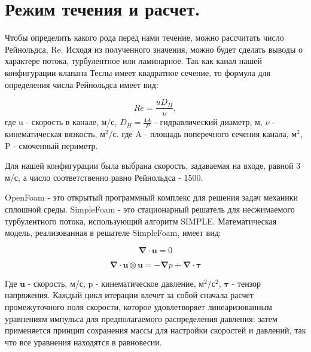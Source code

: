 \documentclass[14pt,a4paper]{article}
\begin{document}
    \section*{Режим течения и расчет.}        
        
        Чтобы определить какого рода перед нами течение, можно рассчитать число Рейнольдса, Re. Исходя из полученного значения, можно будет сделать выводы о характере потока, турбулентное или ламинарное.
        Так как канал нашей конфигурации клапана Теслы имеет квадратное сечение, то формула для определения числа Рейнольдса имеет вид:
        
        \begin{equation}\label{eqn:Re}
            Re = \frac{u D_{H}}{\nu},
        \end{equation}            
        где  u - скорость в канале, м/с, $ D_{H} = \frac{4A}{P} $ - гидравлический диаметр, м, $\nu$ - кинематическая вязкость, м$^{2}/$с. 
        где A - площадь поперечного сечения канала, м$^{2}$, P - смоченный периметр. 
        
        Для нашей конфигурации была выбрана скорость, задаваемая на входе, равной 3 м/с, а число соответственно равно Рейнольдса - 1500.
        
        OpenFoam - это открытый программный комплекс для решения задач механики сплошной среды. SimpleFoam - это стационарный решатель для несжимаемого турбулентного потока, использующий алгоритм SIMPLE. Математическая модель, реализованная в решателе SimpleFoam, имеет вид:
        
        \begin{equation}\label{eqn:simpleFoam}
            \bm{\nabla} \cdot \bm{u} = 0
        \end{equation} 
        
        \begin{equation}\label{eqn:simpleFoam2}
            \bm{\nabla} \cdot \bm{u} \otimes \bm{u} = -\bm{\nabla} p + \bm{\nabla} \cdot \bm{\tau}
        \end{equation} 
        
        Где $\bm{u}$ - скорость, м/с, p - кинематическое давление, м$^{2}/$с$^{2}$, $\bm{\tau}$ - тензор напряжения. 
        Каждый цикл итерации влечет за собой сначала расчет промежуточного поля скорости, которое удовлетворяет линеаризованным уравнениям импульса для предполагаемого распределения давления: затем применяется принцип сохранения массы для настройки скоростей и давлений, так что все уравнения находятся в равновесии.
        
\end{document}
